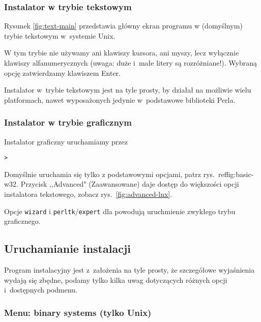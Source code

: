 \documentclass{article}
\begin{document}
\subsubsection{Instalator w trybie tekstowym}

Rysunek \ref{fig:text-main} przedstawia główny ekran programu
 w (domyślnym) trybie tekstowym w~systemie Unix.

W tym trybie nie używamy ani klawiszy kursora, ani myszy,
lecz wyłącznie klawiszy alfanumerycznych (uwaga: duże i~małe litery są
rozróżniane!). Wybraną opcję zatwierdzamy klawiszem Enter.

Instalator w~trybie tekstowym jest na tyle prosty, by działał na
możliwie wielu platformach, nawet wyposażonych jedynie w~podstawowe
biblioteki Perla.


\subsubsection{Instalator w trybie graficznym}
\label{sec:graphical-inst}

Instalator graficzny uruchamiamy przez
\begin{alltt}
> 
\end{alltt}
Domyślnie uruchamia się tylko z podstawowymi opcjami, patrz rys.~ref{fig:basic-w32}.
Przycisk ,,Advanced" (Zaawansowane) daje dostęp do większości  opcji instalatora tekstowego, zobacz rys.~\ref{fig:advanced-lnx}.

Opcje \texttt{wizard} i \texttt{perltk}/\texttt{expert} dla \GUI{} powodują
uruchmienie zwykłego trybu graficznego.


\subsection{Uruchamianie instalacji}
\label{sec:runinstall}

Program instalacyjny jest z~założenia na tyle prosty, że szczegółowe
wyjaśnienia wydają się  zbędne, podamy tylko kilka uwag dotyczących różnych
opcji i~dostępnych podmenu.

\subsubsection{Menu: binary systems (tylko Unix)}
\label{sec:binary}
\end{document}
